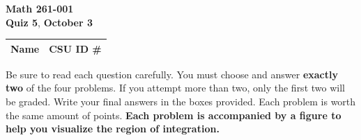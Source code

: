 \documentclass[12pt]{exam}
\newcommand{\class}{Math 261-001} %
\newcommand{\examnum}{Quiz 5} %
\newcommand{\examdate}{October 3} %
\begin{document}
\pagestyle{plain}
\thispagestyle{empty}

\noindent
\textbf{\class}\\
\textbf{\examnum}, \textbf{\examdate} \\



\setlength{\tabcolsep}{3.5cm} %
\renewcommand{\arraystretch}{1.5}
\setlength\extrarowheight{1cm}
\begin{tabular}{ |c|c| } 
 \hline
 Name   & CSU ID \#  \\ 
 \hline
\end{tabular}
\vspace{10pt}

Be sure to read each question carefully. You must choose and answer \textbf{exactly two} of the four problems.  
If you attempt more than two, only the first two will be graded.  
Write your final answers in the boxes provided. Each problem is worth the same amount of points.  
\textbf{Each problem is accompanied by a figure to help you visualize the region of integration.}  
\end{document}
